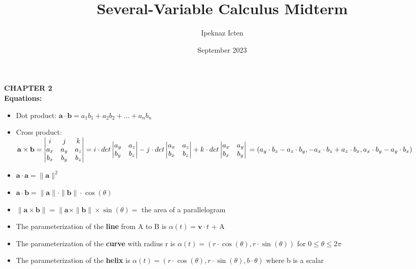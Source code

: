 \documentclass[12pt, letterpaper]{article}
\title{Several-Variable Calculus Midterm}
\author{Ipeknaz Icten}
\date{September 2023}
\begin{document}
\maketitle

\textbf{CHAPTER 2} \\

\textbf{Equations:} 
\begin{itemize}
    \item Dot product: $ \mathbf{a} \cdot \mathbf{b} = a_1 b_1 + a_2 b_2 + \ldots + a_n b_n$
    \item Cross product: $ \mathbf{a} \times \mathbf{b} = \begin{vmatrix} i & j & k \\ a_x & a_y & a_z \\ b_x & b_y & b_z \\ \end{vmatrix} = i \cdot det\begin{vmatrix} a_y & a_z \\ b_y & b_z \\ \end{vmatrix} - j \cdot det\begin{vmatrix} a_x & a_z \\ b_x & b_z \\ \end{vmatrix} + k \cdot det\begin{vmatrix} a_x & a_y \\ b_x & b_y \\ \end{vmatrix} \\ = (a_y \cdot b_z - a_z \cdot b_y, -a_x \cdot b_z + a_z \cdot b_x, a_x \cdot b_y - a_y \cdot b_x)$
    \item $\mathbf{a} \cdot \mathbf{a} = \|\mathbf{a}\|^2 $
    \item $\mathbf{a} \cdot \mathbf{b} = \|\mathbf{a}\| \cdot \|\mathbf{b}\| \cdot \cos(\theta)$ \\
    \item $\|\mathbf{a} \times \mathbf{b}\| = \|\mathbf{a} \times \|\mathbf{b}\| \times \sin(\theta) =$ the area of a parallelogram 
    \item The parameterization of the \textbf{line} from A to B is $\alpha(t) = \mathbf{v} \cdot t$ + A
    \item The parameterization of the \textbf{curve} with radius r is $\alpha(t) = (r \cdot \cos(\theta), r \cdot \sin(\theta))$ for $0 \leq \theta \leq 2\pi$
    \item The parameterization of the \textbf{helix} is $\alpha(t) = (r \cdot \cos(\theta), r \cdot \sin(\theta), b \cdot \theta)$ where b is a scalar \\
\end{itemize}
\end{document}
